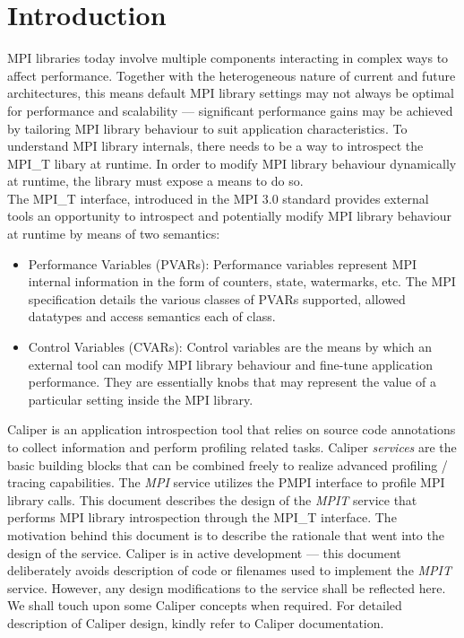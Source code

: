 \chapter*{Introduction}
MPI libraries today involve multiple components interacting in complex ways to affect performance. Together with the heterogeneous nature of current and future architectures, this means default MPI library settings may not always be optimal for performance and scalability --- significant performance gains may be achieved by tailoring MPI library behaviour to suit application characteristics. To understand MPI library internals, there needs to be a way to introspect the MPI\_T libary at runtime. In order to modify MPI library behaviour dynamically at runtime, the library must expose a means to do so. \\
The MPI\_T interface, introduced in the MPI 3.0 standard provides external tools an opportunity to introspect and potentially modify MPI library behaviour at runtime by means of two semantics:
\begin{itemize}
	\item Performance Variables (PVARs): Performance variables represent MPI internal information in the form of counters, state, watermarks, etc. The MPI specification details the various classes of PVARs supported, allowed datatypes and access semantics each of class. 
	\item Control Variables (CVARs): Control variables are the means by which an external tool can modify MPI library behaviour and fine-tune application performance. They are essentially knobs that may represent the value of a particular setting inside the MPI library.
\end{itemize}
Caliper is an application introspection tool that relies on source code annotations to collect information and perform profiling related tasks. Caliper \emph{services} are the basic building blocks that can be combined freely to realize advanced profiling / tracing capabilities. The \emph{MPI} service utilizes the PMPI interface to profile MPI library calls. This document describes the design of the \emph{MPIT} service that performs MPI library introspection through the MPI\_T interface. The motivation behind this document is to describe the rationale that went into the design of the service. Caliper is in active development --- this document deliberately avoids description of code or filenames used to implement the \emph{MPIT} service. However, any design modifications to the service shall be reflected here.\\
We shall touch upon some Caliper concepts when required. For detailed description of Caliper design, kindly refer to Caliper documentation.


